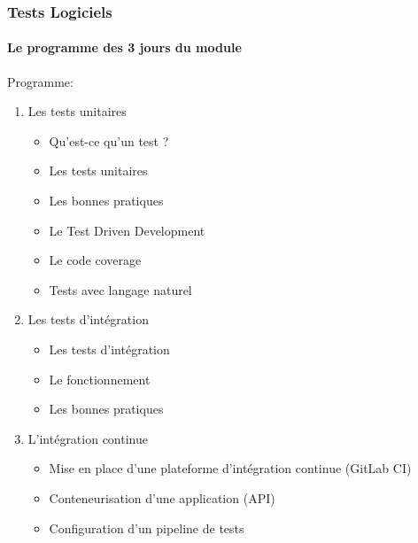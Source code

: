 \documentclass{beamer}
\begin{document}
    \begin{frame}
        \frametitle{Tests Logiciels}
        \framesubtitle{Le programme des 3 jours du module}
        \transdissolve
        Programme:
        \begin{enumerate}
            \item Les tests unitaires
            \begin{itemize}
                \item Qu’est-ce qu’un test ?
                \item Les tests unitaires
                \item Les bonnes pratiques
                \item Le Test Driven Development
                \item Le code coverage
                \item Tests avec langage naturel
            \end{itemize}
            \item  Les tests d’intégration
            \begin{itemize}
                \item  Les tests d’intégration
                \item  Le fonctionnement
                \item  Les bonnes pratiques
            \end{itemize}
            \item L’intégration continue
            \begin{itemize}
                \item  Mise en place d’une plateforme d’intégration continue (GitLab CI)
                \item  Conteneurisation d’une application (API)
                \item  Configuration d’un pipeline de tests
            \end{itemize}
        \end{enumerate}
    \end{frame}
\end{document}
